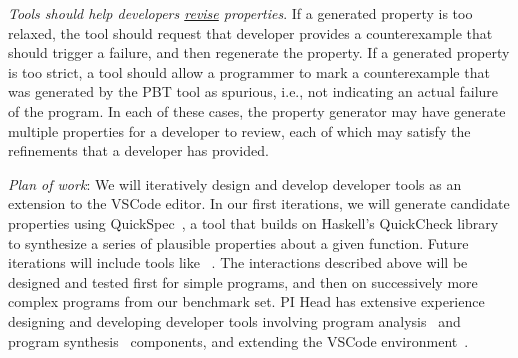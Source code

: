 \textit{Tools should help developers \underline{revise} properties}. If a generated
property is too relaxed, the tool should request that developer provides a
counterexample that should trigger a failure, and then regenerate the property.
If a generated property is too strict, a tool should allow a programmer to mark
a counterexample that was generated by the PBT tool as spurious, i.e., not
indicating an actual failure of the program. In each of these cases, the
property generator may have generate multiple properties for a developer to
review, each of which may satisfy the refinements that a developer has provided.

\textit{Plan of work}: We will iteratively design and develop developer tools as
an extension to the VSCode editor. In our first iterations, we will generate
candidate properties using QuickSpec~\cite{claessen2010quickspec}, a tool that
builds on Haskell's QuickCheck library to synthesize a series of plausible
properties about a given function. Future iterations will include tools like
~\cite{smith_discovering_2017}.
The interactions described above will be
designed and tested first for simple programs, and then on successively more
complex programs from our benchmark set. PI Head has extensive experience
designing and developing developer tools involving program
analysis~\cite{head2018interactive,head2019managing} and program
synthesis~\cite{head2017writing} components, and extending the VSCode
environment~\cite{head2020composing}.






